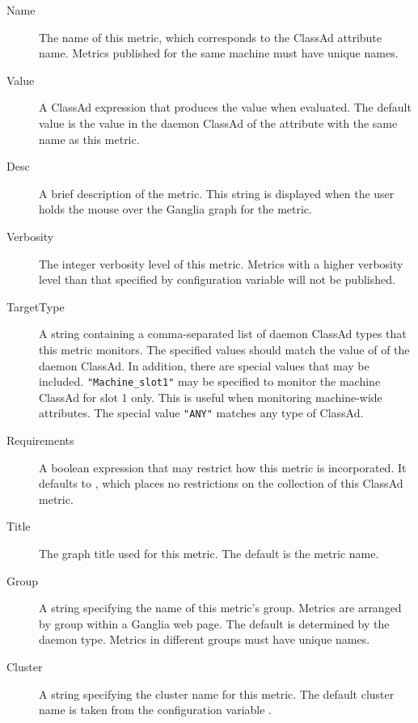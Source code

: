   \begin{description}

  \item[Name] The name of this metric,  
    which corresponds to the ClassAd attribute name.
    Metrics published for the same machine must have unique names.

  \item[Value] A ClassAd expression that produces the value when evaluated.
    The default value is the value in the daemon ClassAd of the
    attribute with the same name as this metric.

  \item[Desc] A brief description of the metric.  This string is displayed 
    when the user holds the mouse over the Ganglia graph for the metric.

  \item[Verbosity] The integer verbosity level of this metric.  
    Metrics with a higher verbosity level than that specified by
    configuration variable  will not be published.

  \item[TargetType] A string containing a comma-separated list of daemon
    ClassAd types that this metric monitors.  The specified values should
    match the value of  of the daemon ClassAd.  
    In addition, there are
    special values that may be included. \verb|"Machine_slot1"| may be
    specified to monitor the machine ClassAd for slot 1 only.  This is
    useful when monitoring machine-wide attributes.  The special
    value \verb|"ANY"| matches any type of ClassAd.

  \item[Requirements] A boolean expression that may restrict how this
    metric is incorporated.  It defaults to , which places
    no restrictions on the collection of this ClassAd metric.

  \item[Title] The graph title used for this metric.  The default is the
    metric name.

  \item[Group] A string specifying the name of this metric's group.
    Metrics are arranged by group within a Ganglia web page.  The
    default is determined by the daemon type.  Metrics in different
    groups must have unique names.

  \item[Cluster] A string specifying the cluster name for this metric.
    The default cluster name is taken from the configuration variable
    .


\end{description}
